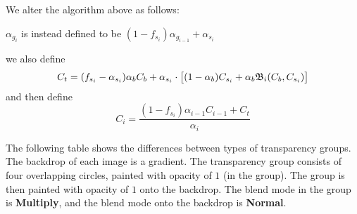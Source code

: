 We alter the algorithm above as follows:
\blist
    \item $\alpha_{g_i}$ is instead defined to be $(1-f_{s_i})\alpha_{g_{i-1}}+\alpha_{s_i}$
    \item we also define 
    $$ C_t=(f_{s_i}-\alpha_{s_i})\alpha_bC_b + \alpha_{s_i}\cdot\bigl[(1-\alpha_b)C_{s_i}+
    \alpha_b{\frak B}_i(C_b,C_{s_i})\bigr] $$
    and then define
    $$ C_i = \frac{(1-f_{s_i})\alpha_{i-1}C_{i-1}+C_t}{\alpha_i} $$
\elist


The following table shows the differences between types of transparency groups.
The backdrop of each image is a gradient.
The transparency group consists of four overlapping circles, painted with opacity of $1$ (in the group).
The group is then painted with opacity of $1$ onto the backdrop.
The blend mode in the group is {\bf Multiply}, and the blend mode onto the backdrop is {\bf Normal}. 

\bgroup
\def\transgroup#1#2{%
\setbox0=\hbox to100pt{\vrule width0pt height100pt depth0pt%
\pdfliteral{
    \@normtrans\space
    .75 g
    /Gs gs
    \circle{40}{60}{30} f
    \circle{60}{60}{30} f
    \circle{40}{40}{30} f
    \circle{60}{40}{30} f
}\hfil%
}

\immediate\pdfxform attr{
/Group <<
    /S /Transparency
    /CS /DeviceRGB
    /I #1
    /K #2
>>
} resources {
/ExtGState <<
    /Gs <<
        /ca 1
        /BM /Multiply
    >>
>>
}0

\edef\Circ{\the\pdflastxform}

\setbox0=\hbox to100pt{\vrule width0pt height100pt depth0pt%
\pdfliteral{
    q
    \@normtrans\space
    /Sh sh
    /Gs gs
    /Circ Do
    Q
}\hfil}

\pdfxform resources{
/Shading << /Sh
    <<
        /ShadingType 2
        /ColorSpace /DeviceRGB
        /Coords [0 0 100 0]
        /Domain [0 1]
        /Function <<
            /FunctionType 3
            /Bounds [.5]
            /Encode [0 1 0 1]
            /Domain [0 1]
            /Functions [
            <<
                /FunctionType 2
                /Domain [0 1]
                /C0 [1 0 0]
                /C1 [0 1 0]
                /N 1
            >>
            <<
                /FunctionType 2
                /Domain [0 1]
                /C0 [0 1 0]
                /C1 [0 0 1]
                /N 1
            >>
            ]
        >>
    >>
>>
/XObject <<
    /Circ \Circ\space0 R
>>
/ExtGState <<
    /Gs << /BM /Normal /ca 1 >>
>>
}0

\hbox{$\vcenter{\pdfrefxform\pdflastxform}$}
}

